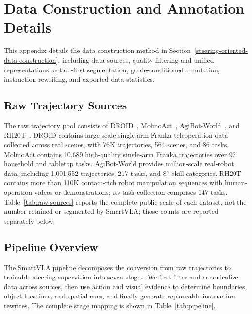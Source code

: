 \section{Data Construction and Annotation Details}
\label{appendix:data-construction}

This appendix details the data construction method in
Section~\ref{steering-oriented-data-construction},
including data sources, quality filtering and unified representations,
action-first segmentation, grade-conditioned annotation, instruction
rewriting, and exported data statistics.

\hypertarget{raw-trajectory-sources}{%
\subsection{Raw Trajectory Sources}\label{raw-trajectory-sources}}

The raw trajectory pool consists of DROID~\citep{khazatsky2024droid},
MolmoAct~\citep{lee2025molmoact}, AgiBot-World~\citep{agibot2025world}, and
RH20T~\citep{fang2023rh20t}. DROID contains large-scale single-arm Franka teleoperation data
collected across real scenes, with 76K trajectories, 564
scenes, and 86 tasks. MolmoAct contains 10,689 high-quality single-arm
Franka trajectories over 93 household and tabletop tasks. AgiBot-World
provides million-scale real-robot data, including
1,001,552 trajectories, 217 tasks, and 87 skill
categories. RH20T contains more than 110K contact-rich robot
manipulation sequences with human-operation videos or demonstrations;
its task collection comprises 147 tasks. Table~\ref{tab:raw-sources} reports the complete public
scale of each
dataset, not the number retained or segmented by SmartVLA; those counts
are reported separately below.

%

\hypertarget{pipeline-overview}{%
\subsection{Pipeline Overview}\label{pipeline-overview}}

The SmartVLA pipeline decomposes the conversion from raw trajectories to
trainable steering supervision into seven stages. We first filter and
canonicalize data across sources, then use action and visual evidence to
determine boundaries, object locations, and spatial cues, and finally
generate replaceable instruction rewrites. The complete stage mapping is
shown in Table~\ref{tab:pipeline}.

